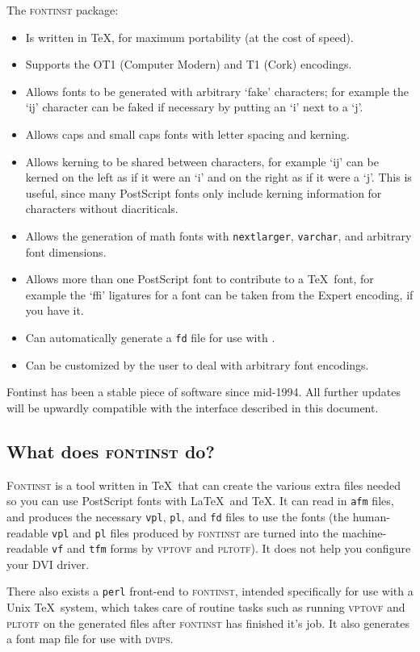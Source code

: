 \documentclass[a4paper]{ltxguide}
\newcommand{\PS}{Post\-Script\xspace}
\newcommand*{\setfilename}[1]{\texttt{#1}}
\newcommand*{\setpackagename}[1]{\textsc{#1}}
\newcommand{\dvips}   {\setpackagename{dvips}\xspace}
\newcommand{\fontinst}{\setpackagename{font\-inst}\xspace}
\newcommand{\Fontinst}{\setpackagename{Font\-inst}\xspace}
\newcommand{\vf} {\setfilename{vf}\xspace}
\newcommand{\pl} {\setfilename{pl}\xspace}
\newcommand{\fd} {\setfilename{fd}\xspace}
\newcommand{\afm}{\setfilename{afm}\xspace}
\newcommand{\vpl}{\setfilename{vpl}\xspace}
\newcommand{\tfm}{\setfilename{tfm}\xspace}
\newcommand{\vptovf}{\setpackagename{vptovf}\xspace}
\newcommand{\pltotf}{\setpackagename{pltotf}\xspace}
\begin{document}
The \fontinst package:
\begin{itemize}
\item Is written in \TeX, for maximum portability (at the cost of
  speed).
\item Supports the OT1 (Computer Modern) and T1 (Cork) encodings.
\item Allows fonts to be generated with arbitrary `fake'
  characters; for example the `ij' character can be faked if
  necessary by putting an `i' next to a `j'.
\item Allows caps and small caps fonts with letter spacing and
  kerning.
\item Allows kerning to be shared between characters, for example
  `ij' can be kerned on the left as if it were an `i' and on the
  right as if it were a `j'.  This is useful, since many
  PostScript fonts only include kerning information for characters
  without diacriticals.
\item Allows the generation of math fonts with \verb|nextlarger|,
  \verb|varchar|, and arbitrary font dimensions.
\item Allows more than one PostScript font to contribute to a
  \TeX\ font, for example the `ffi' ligatures for a font can be
  taken from the Expert encoding, if you have it.
\item Can automatically generate a \fd file for use with \LaTeXe.
\item Can be customized by the user to deal with arbitrary font
  encodings.
\end{itemize}
Fontinst has been a stable piece of software since mid-1994.  All
further updates will be upwardly compatible with the interface
described in this document.

\subsection{What does \fontinst do?}

\Fontinst is a tool written in \TeX\ that can create the various
extra files needed so you can use \PS fonts with \LaTeX\ and \TeX.
It can read in \afm files, and produces the necessary \vpl, \pl,
and \fd files to use the fonts (the human-readable \vpl and \pl
files produced by \fontinst are turned into the machine-readable
\vf and \tfm forms by \vptovf and \pltotf).  It does not help you
configure your DVI driver.

There also exists a \texttt{perl} front-end to \fontinst, intended
specifically for use with a Unix \TeX\ system, which takes care of
routine tasks such as running \vptovf and \pltotf on the generated
files after \fontinst has finished it's job.  It also generates a
font map file for use with \dvips.
\end{document}
